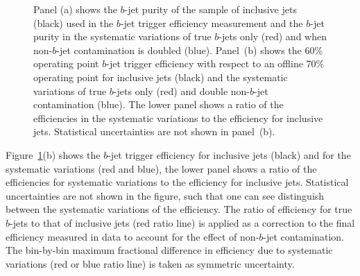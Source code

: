 \begin{figure}[!b]
  \begin{center}
    \captionsetup[subfigure]{aboveskip=0pt,justification=centering}
  \end{center}
\vspace{-1em}
  \caption[The $b$-jet purity and $b$-jet trigger efficiency when the size of the non-$b$-jet contamination is systematically varied.]
          {\label{fig:Eff_Purity} Panel (a) shows the $b$-jet purity of the sample of inclusive jets (black) used in the $b$-jet trigger efficiency measurement
    and the $b$-jet purity in the systematic variations of true $b$-jets only (red) and when non-$b$-jet contamination is doubled (blue).
    Panel~(b) shows the 60\% operating point $b$-jet trigger efficiency with respect to an offline 70\% operating point for inclusive jets (black)
    and the systematic variations of true $b$-jets only (red) and double non-$b$-jet contamination (blue).
    The lower panel shows a ratio of the efficiencies in the systematic variations to the efficiency for inclusive jets.
    Statistical uncertainties are not shown in panel~(b).}
\end{figure}

Figure~\ref{fig:Eff_Purity}(b) shows the $b$-jet trigger efficiency for inclusive jets (black) and
for the systematic variations (red and blue),
the lower panel shows a ratio of the efficiencies for systematic variations to the efficiency for inclusive jets.
Statistical uncertainties are not shown in the figure, such that one can see distinguish between the systematic variations of the efficiency.
The ratio of efficiency for true $b$-jets to that of inclusive jets (red ratio line) is applied as a correction to the final efficiency measured in data
to account for the effect of non-$b$-jet contamination.
The bin-by-bin maximum fractional difference in efficiency due to systematic variations (red or blue ratio line) is taken as symmetric uncertainty.


